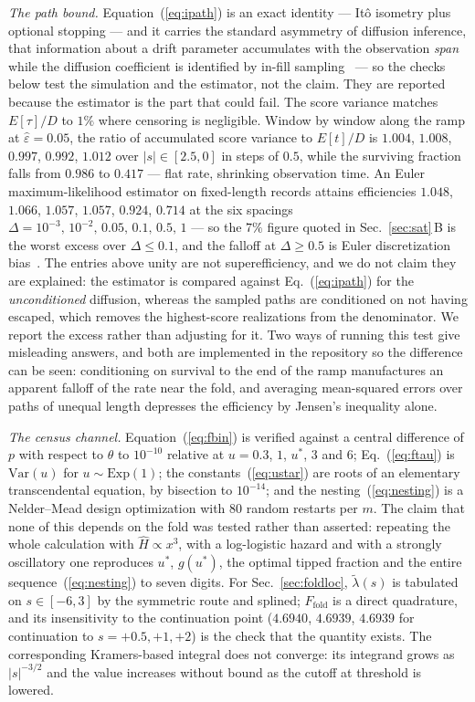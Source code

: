 \documentclass[%
 twocolumn,
 superscriptaddress,
 amsmath,amssymb,
 aps,
 pre,
 floatfix,
]{revtex4-2}
\newcommand{\Sig}{\hat\varepsilon}
\begin{document}
\emph{The path bound.}  Equation~(\ref{eq:ipath}) is an exact identity --- It\^o isometry plus optional stopping --- and it carries the standard asymmetry of diffusion inference, that information about a drift parameter accumulates with the observation \emph{span} while the diffusion coefficient is identified by in-fill sampling~\cite{Merton1980,Gobet2001} --- so the checks below test the simulation and the estimator, not the claim.  They are reported because the estimator is the part that could fail.  The score variance matches $E[\tau]/D$ to $1\%$ where censoring is negligible.  Window by window along the ramp at $\Sig=0.05$, the ratio of accumulated score variance to $E[t]/D$ is $1.004$, $1.008$, $0.997$, $0.992$, $1.012$ over $|s|\in[2.5,0]$ in steps of $0.5$, while the surviving fraction falls from $0.986$ to $0.417$ --- flat rate, shrinking observation time.  An Euler maximum-likelihood estimator on fixed-length records attains efficiencies $1.048$, $1.066$, $1.057$, $1.057$, $0.924$, $0.714$ at the six spacings $\Delta=10^{-3},\,10^{-2},\,0.05,\,0.1,\,0.5,\,1$ --- so the $7\%$ figure quoted in Sec.~\ref{sec:sat}\,B is the worst excess over $\Delta\le0.1$, and the falloff at $\Delta\ge0.5$ is Euler discretization bias~\cite{FlorensZmirou1989}.  The entries above unity are not superefficiency, and we do not claim they are explained: the estimator is compared against Eq.~(\ref{eq:ipath}) for the \emph{unconditioned} diffusion, whereas the sampled paths are conditioned on not having escaped, which removes the highest-score realizations from the denominator.  We report the excess rather than adjusting for it.  Two ways of running this test give misleading answers, and both are implemented in the repository so the difference can be seen: conditioning on survival to the end of the ramp manufactures an apparent falloff of the rate near the fold, and averaging mean-squared errors over paths of unequal length depresses the efficiency by Jensen's inequality alone.

\emph{The census channel.}  Equation~(\ref{eq:fbin}) is verified against a central difference of $p$ with respect to $\theta$ to $10^{-10}$ relative at $u=0.3$, $1$, $u^\ast$, $3$ and $6$; Eq.~(\ref{eq:ftau}) is $\mathrm{Var}(u)$ for $u\sim\mathrm{Exp}(1)$; the constants~(\ref{eq:ustar}) are roots of an elementary transcendental equation, by bisection to $10^{-14}$; and the nesting~(\ref{eq:nesting}) is a Nelder--Mead design optimization with $80$ random restarts per $m$.  The claim that none of this depends on the fold was tested rather than asserted: repeating the whole calculation with $\hat H\propto x^3$, with a log-logistic hazard and with a strongly oscillatory one reproduces $u^\ast$, $g(u^\ast)$, the optimal tipped fraction and the entire sequence~(\ref{eq:nesting}) to seven digits.  For Sec.~\ref{sec:foldloc}, $\tilde\lambda(s)$ is tabulated on $s\in[-6,3]$ by the symmetric route and splined; $F_{\mathrm{fold}}$ is a direct quadrature, and its insensitivity to the continuation point ($4.6940$, $4.6939$, $4.6939$ for continuation to $s=+0.5,+1,+2$) is the check that the quantity exists.  The corresponding Kramers-based integral does not converge: its integrand grows as $|s|^{-3/2}$ and the value increases without bound as the cutoff at threshold is lowered.
\end{document}
